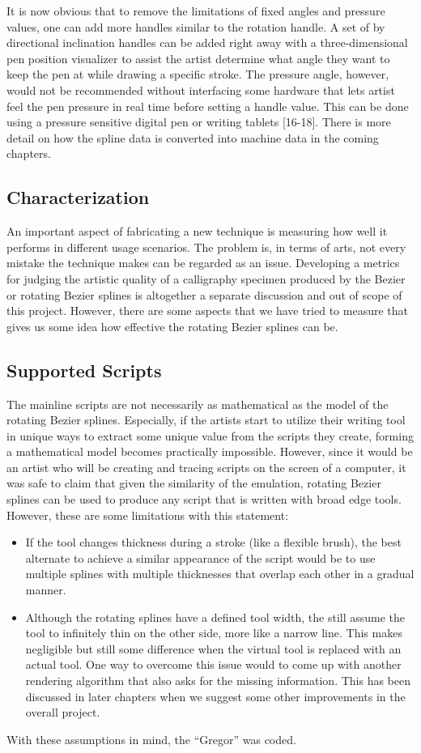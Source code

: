 It is now obvious that to remove the limitations of fixed angles and pressure values, one can add more handles similar to the rotation handle. A set of by directional inclination handles can be added right away with a three-dimensional pen position visualizer to assist the artist determine what angle they want to keep the pen at while drawing a specific stroke. The pressure angle, however, would not be recommended without interfacing some hardware that lets artist feel the pen pressure in real time before setting a handle value. This can be done using a pressure sensitive digital pen or writing tablets [16-18].
There is more detail on how the spline data is converted into machine data in the coming chapters.

\subsection{Characterization}
An important aspect of fabricating a new technique is measuring how well it performs in different usage scenarios. The problem is, in terms of arts, not every mistake the technique makes can be regarded as an issue. Developing a metrics for judging the artistic quality of a calligraphy specimen produced by the Bezier or rotating Bezier splines is altogether a separate discussion and out of scope of this project. However, there are some aspects that we have tried to measure that gives us some idea how effective the rotating Bezier splines can be.

\subsection{Supported Scripts}
The mainline scripts are not necessarily as mathematical as the model of the rotating Bezier splines. Especially, if the artists start to utilize their writing tool in unique ways to extract some unique value from the scripts they create, forming a mathematical model becomes practically impossible. However, since it would be an artist who will be creating and tracing scripts on the screen of a computer, it was safe to claim that given the similarity of the emulation, rotating Bezier splines can be used to produce any script that is written with broad edge tools. However, these are some limitations with this statement:

\begin{itemize}
\item If the tool changes thickness during a stroke (like a flexible brush), the best alternate to achieve a similar appearance of the script would be to use multiple splines with multiple thicknesses that overlap each other in a gradual manner.
\item Although the rotating splines have a defined tool width, the still assume the tool to infinitely thin on the other side, more like a narrow line. This makes negligible but still some difference when the virtual tool is replaced with an actual tool. One way to overcome this issue would to come up with another rendering algorithm that also asks for the missing information. This has been discussed in later chapters when we suggest some other improvements in the overall project.
\end{itemize}
With these assumptions in mind, the “Gregor” was coded.
